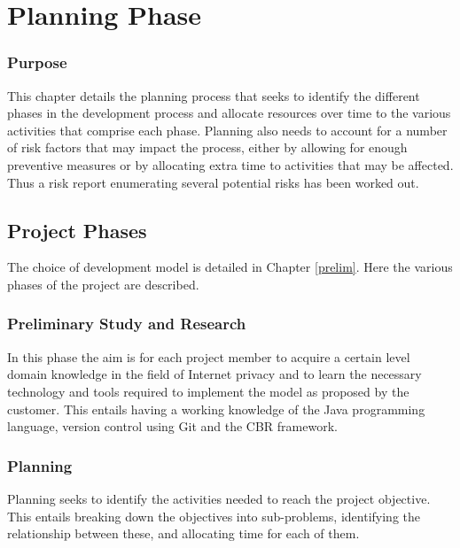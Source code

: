  

\chapter{Planning Phase}
\label{plan}

\minitoc 

\subsection*{Purpose}
This chapter details the planning process that seeks to identify the different phases in the development process and allocate resources over time to the various activities that comprise each phase. Planning also needs to account for a number of risk factors that may impact the process, either by allowing for enough preventive measures or by allocating extra time to activities that may be affected. Thus a risk report enumerating several potential risks has been worked out.

\section{Project Phases}\label{phases}
The choice of development model is detailed in Chapter \ref{prelim}. Here the various phases of the project are described.

\subsection{Preliminary Study and Research}
In this phase the aim is for each project member to acquire a certain level domain knowledge in the field of Internet privacy and to learn the necessary technology and tools required to implement the model as proposed by the customer. This entails having a working knowledge of the Java programming language, version control using Git and the CBR framework.

\subsection{Planning}
Planning seeks to identify the activities needed to reach the project objective. This entails breaking down the objectives into sub-problems, identifying the relationship between these, and allocating time for each of them. 

